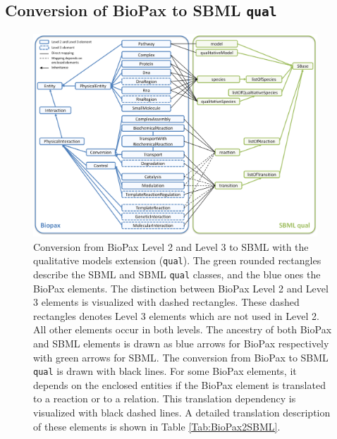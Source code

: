 \documentclass{bioinfo}
\newcommand{\qual}{\texttt{qual}}
\begin{document}
\begin{methods}
\subsection{Conversion of BioPax to SBML \qual}
\begin{figure}[t!h]
\centering \includegraphics[width=0.95\textwidth]{BioPaxSBMLqual.png}
\caption{Conversion from BioPax Level 2 and Level 3 to SBML with the qualitative models extension (\qual).
The green rounded rectangles describe the SBML and SBML \qual{} classes, and the blue ones the BioPax elements.
The distinction between BioPax Level 2 and Level 3 elements is visualized with dashed rectangles.
These dashed rectangles denotes Level 3 elements which are not used in Level 2.
All other elements occur in both levels.
The ancestry of both BioPax and SBML elements is drawn as blue arrows for BioPax respectively with green arrows for SBML.
The conversion from BioPax to SBML \qual{} is drawn with black lines.
For some BioPax elements, it depends on the enclosed entities if the BioPax element is translated to a reaction or to a relation.
This translation dependency is visualized with black dashed lines.
A detailed translation description of these elements is shown in Table \ref{Tab:BioPax2SBML}.}
\label{fig:BioPaxSBMLqual}
\end{figure}


\end{methods}
\end{document}
